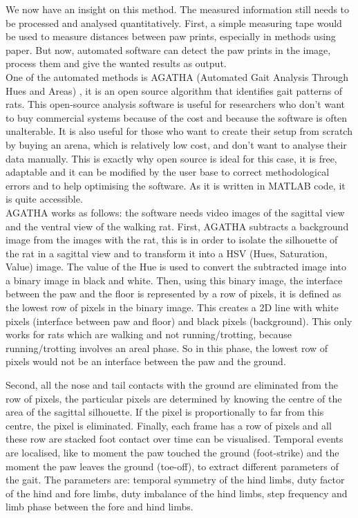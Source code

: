 We now have an insight on this method. The measured information still needs to be processed and analysed quantitatively. First, a simple measuring tape would be used to measure distances between paw prints, especially in methods using paper. But now, automated software can detect the paw prints in the image, process them and give the wanted results as output.\\

One of the automated methods is AGATHA (Automated Gait Analysis Through Hues and Areas) \cite{agatha2}, it is an open source algorithm that identifies gait patterns of rats. This open-source analysis software is useful for researchers who don't want to buy commercial systems because of the cost and because the software is often unalterable. It is also useful for those who want to create their setup from scratch by buying an arena, which is relatively low cost, and don't want to analyse their data manually.
This is exactly why open source is ideal for this case, it is free, adaptable and it can be modified by the user base to correct methodological errors and to help optimising the software. As it is written in MATLAB\textsuperscript{\textregistered} code, it is quite accessible.\\

AGATHA works as follows: the software needs video images of the sagittal view and the ventral view of the walking rat. First, AGATHA subtracts a background image from the images with the rat, this is in order to isolate the silhouette of the rat in a sagittal view and to transform it into a HSV (Hues, Saturation, Value) image. The value of the Hue is used to convert the subtracted image into a binary image in black and white. Then, using this binary image, the interface between the paw and the floor is represented by a row of pixels, it is defined as the lowest row of pixels in the binary image. This creates a 2D line with white pixels (interface between paw and floor) and black pixels (background). This only works for rats which are walking and not running/trotting, because running/trotting involves an areal phase. So in this phase, the lowest row of pixels would not be an interface between the paw and the ground.

Second, all the nose and tail contacts with the ground are eliminated from the row of pixels, the particular pixels are determined by knowing the centre of the area of the sagittal silhouette. If the pixel is proportionally to far from this centre, the pixel is eliminated. Finally, each frame has a row of pixels and all these row are stacked foot contact over time can be visualised. Temporal events are localised, like to moment the paw touched the ground (foot-strike) and the moment the paw leaves the ground (toe-off), to extract different parameters of the gait. The parameters are: temporal symmetry of the hind limbs, duty factor of the hind and fore limbs, duty imbalance of the hind limbs, step frequency and limb phase between the fore and hind limbs.


